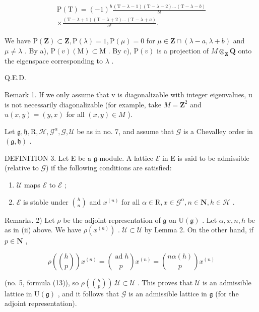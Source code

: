 \[
\begin{array}{c} \mathrm{P(T)} = (- 1) ^ {b} \frac {(\mathrm{T} - \lambda - 1) (\mathrm{T} - \lambda - 2) \ldots (\mathrm{T} - \lambda - b)}{b !} \\ \times \frac {(\mathrm{T} - \lambda + 1) (\mathrm{T} - \lambda + 2) \ldots (\mathrm{T} - \lambda + a)}{a !}. \end{array}
\]

We have \(\mathrm{P}(\mathbf{Z})\subset\mathbf{Z},\mathrm{P}(\lambda)=1,\mathrm{P}(\mu)=0\) for \(\mu\in\mathbf{Z}\cap(\lambda-a,\lambda+b)\) and \(\mu\neq\lambda\) . By a), \(\mathrm{P}(v)(\mathrm{M})\subset\mathrm{M}\) . By c), \(\mathrm{P}(v)\) is a projection of \(M\otimes_{\mathbf{Z}}\mathbf{Q}\) onto the eigenspace corresponding to \(\lambda\) .

Q.E.D.

Remark 1. If we only assume that v is diagonalizable with integer eigenvalues, u is not necessarily diagonalizable (for example, take \(M = \mathbf{Z}^{2}\) and \(u(x, y) = (y, x)\) for all \((x, y) \in M\) ).

Let \(\mathfrak{g},\mathfrak{h},\mathrm{R},\mathcal{H},\mathcal{G}^{\alpha},\mathcal{G},\mathcal{U}\) be as in no. 7, and assume that \(\mathcal{G}\) is a Chevalley order in \((\mathfrak{g},\mathfrak{h})\) .

DEFINITION 3. Let E be a \(\mathfrak{g}\)-module. A lattice \(\mathcal{E}\) in E is said to be admissible (relative to \(\mathcal{G}\)) if the following conditions are satisfied:

\begin{enumerate}
\def\labelenumi{(\roman{enumi})}
\item
  \(\mathcal{U}\) maps \(\mathcal{E}\) to \(\mathcal{E}\) ;
\item
  \(\mathcal{E}\) is stable under \(\binom{h}{n}\) and \(x^{(n)}\) for all \(\alpha \in \mathrm{R}, x \in \mathcal{G}^{\alpha}, n \in \mathbf{N}, h \in \mathcal{H}\) .
\end{enumerate}

Remarks. 2) Let \(\rho\) be the adjoint representation of \(\mathfrak{g}\) on \(\mathrm{U}(\mathfrak{g})\) . Let \(\alpha, x, n, h\) be as in (ii) above. We have \(\rho(x^{(n)})\) . \(\mathcal{U} \subset \mathcal{U}\) by Lemma 2. On the other hand, if \(p \in \mathbf{N}\) ,

\[
\rho \left(\binom{h}{p}\right) x ^ {(n)} = \binom{\operatorname{ad} h}{p} x ^ {(n)} = \binom{n \alpha (h)}{p} x ^ {(n)}
\]

(no. 5, formula (13)), so \(\rho\left(\binom{h}{p}\right). \mathcal{U} \subset \mathcal{U}\) . This proves that \(\mathcal{U}\) is an admissible lattice in \(\mathrm{U}(\mathfrak{g})\) , and it follows that \(\mathcal{G}\) is an admissible lattice in \(\mathfrak{g}\) (for the adjoint representation).

